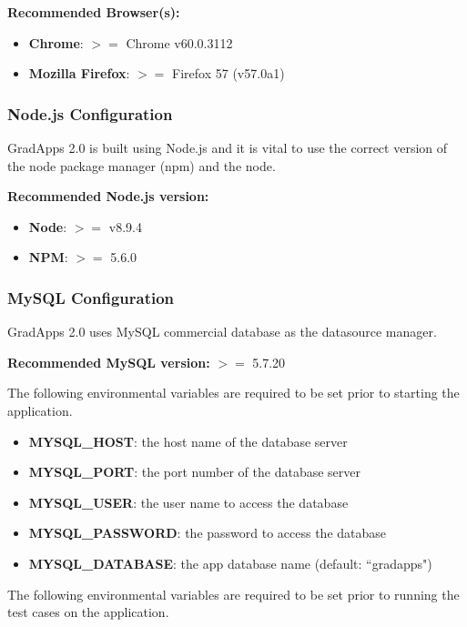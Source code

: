 \documentclass[fontsize=12pt,paper=letter,twoside]{scrartcl}
\begin{document}
\bigskip
\noindent\textbf{Recommended Browser(s):}

\begin{itemize}
\item \textbf{Chrome}: $>=$ Chrome v60.0.3112
\item \textbf{Mozilla Firefox}: $>=$ Firefox 57 (v57.0a1)
\end{itemize}

\subsubsection{Node.js Configuration}
GradApps 2.0 is built using Node.js and it is vital to use the correct version of the node package manager (npm) and the node.

\bigskip
\noindent\textbf{Recommended Node.js version:}

\begin{itemize}
\item \textbf{Node}: $>=$ v8.9.4
\item \textbf{NPM}: $>=$ 5.6.0
\end{itemize}

\subsubsection{MySQL Configuration}
GradApps 2.0 uses MySQL commercial database as the datasource manager.

\bigskip
\noindent \textbf{Recommended MySQL version:} $>=$ 5.7.20

\bigskip
\noindent The following environmental variables are required to be set prior to starting the application.

\begin{itemize}
\item \textbf{MYSQL\_HOST}: the host name of the database server
\item \textbf{MYSQL\_PORT}: the port number of the database server
\item \textbf{MYSQL\_USER}: the user name to access the database
\item \textbf{MYSQL\_PASSWORD}: the password to access the database
\item \textbf{MYSQL\_DATABASE}: the app database name (default: ``gradapps")
\end{itemize}

\bigskip
\noindent The following environmental variables are required to be set prior to running the test cases on the application.
\end{document}
